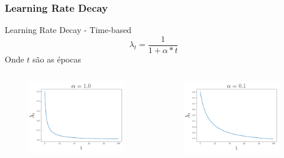\documentclass{beamer}
\begin{document}
	\begin{frame}
		\frametitle{Learning Rate Decay}
		\begin{block}{Learning Rate Decay - Time-based}
			$$\lambda_t = \frac{1}{1 + \alpha *t}$$ 
			Onde $t$ são as épocas
			\begin{columns}
				\begin{column}{0.3 \textwidth}
					\begin{figure}
						\centering
						\includegraphics[width=1\linewidth]{figures/lr_decay1.png}
					\end{figure}
				\end{column}
				\begin{column}{0.3 \textwidth}
					\begin{figure}
						\centering
						\includegraphics[width=1\linewidth]{figures/lr_decay2.png}

\end{figure}
\end{column}
\end{columns}
\end{block}
\end{frame}
\end{document}

